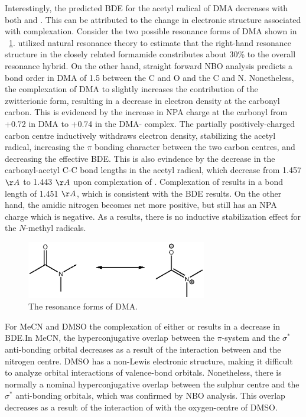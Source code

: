 Interestingly, the predicted BDE for the acetyl radical of DMA decreases with
both  and . This can be attributed to the change in
electronic structure associated with complexation. Consider the two possible
resonance forms of DMA shown in ~\ref{fig:dma-res}. \cite{Hrabal1997} utilized
natural resonance theory to estimate that the right-hand resonance structure in
the closely related formamide constributes about 30\% to the overall resonance
hybrid. On the other hand, straight forward NBO analysis predicts a bond order
in DMA of 1.5 between the C and O and the C and N. Nonetheless, the
complexation of DMA to  slightly increases the contribution of the
zwitterionic form, resulting in a decrease in electron density at the carbonyl
carbon. This is evidenced by the increase in NPA charge at the carbonyl from
+0.72 in DMA to +0.74 in the DMA- complex.  The partially
positively-charged carbon centre inductively withdraws electron density,
stabilizing the acetyl radical, increasing the $\pi$ bonding character between
the two carbon centres, and decreasing the effective BDE. This is also
evindence by the decrease in the carbonyl-acetyl C-C bond lengths in the acetyl
radical, which decrease from 1.457 $\AA$ to 1.443 $\AA$ upon complexation of
. Complexation of  results in a bond length of 1.451 $\AA$,
which is consistent with the BDE results.  On the other hand, the amidic
nitrogen becomes net more positive, but still has an NPA charge which is
negative. As a results, there is no inductive stabilization effect for the
$N$-methyl radicals.

\begin{figure}[!htpb]
  \centering
  \includegraphics[width=0.7\textwidth]{figures/DMA-resonance.eps}
  \caption{The resonance forms of DMA.}
  \label{fig:dma-res}
\end{figure}

For MeCN and DMSO the complexation of either  or  results in
a decrease in  BDE.\@ In MeCN, the hyperconjugative overlap between the
 $\pi$-system and the  $\sigma^*$ anti-bonding orbital
decreases as a result of the interaction between  and the nitrogen
centre. DMSO has a non-Lewis electronic structure, making it difficult to
analyze orbital interactions of valence-bond orbitals. Nonetheless, there is
normally a nominal hyperconjugative overlap between the sulphur centre and the
 $\sigma^*$ anti-bonding orbitals, which was confirmed by NBO analysis.
This overlap decreases as a result of the interaction of  with the
oxygen-centre of DMSO.

